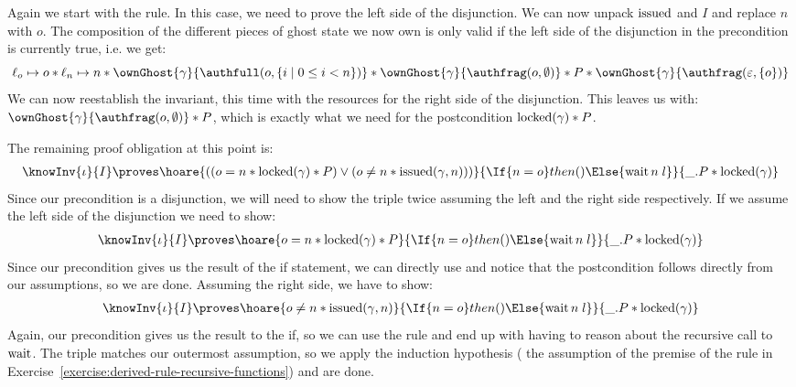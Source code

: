 Again we start with the  rule. In this case, we need to prove the left side of the disjunction. We can now unpack $\operatorname{issued}$ and $I$ and replace $n$ with $o$. The composition of the different pieces of ghost state we now own is only valid if the left side of the disjunction in the precondition is currently true, i.e. we get:
$$\ell_{o} \pointsto o \ast \ell_{n} \pointsto n \ast \ownGhost{\gamma}{\authfull (o, \{ i \mid 0 \leq i < n \})} \ast \ownGhost{\gamma}{\authfrag (o, \emptyset)} \ast P \ast \ownGhost{\gamma}{\authfrag (\epsilon, \{o\})}$$
We can now reestablish the invariant, this time with the resources for the right side of the disjunction. This leaves us with:
$\ownGhost{\gamma}{\authfrag (o, \emptyset)} \ast P$, which is exactly what we need for the postcondition $\operatorname{locked} (\gamma) \ast P$.

The remaining proof obligation at this point is:
\begin{align*}
 \knowInv{\iota}{I}\proves \hoare{((o = n \ast \locked (\gamma) \ast P) \lor (o \neq n \ast \issued (\gamma, n)))}{\If{n = o}then{()}\Else{\wait n \; l}}{\_.P \ast \locked(\gamma)}
\end{align*}
Since our precondition is a disjunction, we will need to show the triple twice assuming the left and the right side respectively.
If we assume the left side of the disjunction we need to show:
\begin{align*}
  \knowInv{\iota}{I}\proves \hoare{o = n \ast \locked (\gamma) \ast P}{\If{n = o}then{()}\Else{\wait n \; l}}{\_.P \ast \locked(\gamma)}
\end{align*}
Since our precondition gives us the result of the if statement, we can directly use  and notice that the postcondition follows directly from our assumptions, so we are done.
Assuming the right side, we have to show:
\begin{align*}
  \knowInv{\iota}{I}\proves \hoare{o \neq n \ast \issued (\gamma,n)}{\If{n = o}then{()}\Else{\wait n \; l}}{\_.P \ast \locked(\gamma)}
\end{align*}
Again, our precondition gives us the result to the if, so we can use the  rule and end up with having to reason about the recursive call to $\operatorname{wait}$. The triple matches our outermost assumption, so we apply the induction hypothesis (\ie{} the assumption of the premise of the rule in Exercise~\ref{exercise:derived-rule-recursive-functions}) and are done.

